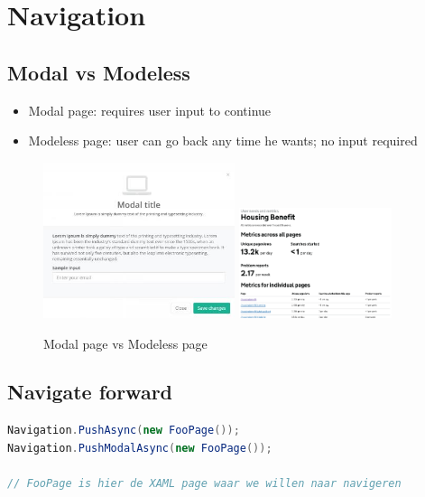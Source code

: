 \documentclass{article}
\begin{document}
\section{Navigation}

\subsection{Modal vs Modeless}

\begin{itemize}
    \item Modal page: requires user input to continue
    \item Modeless page: user can go back any time he wants; no input required
\end{itemize}

\begin{figure}[H]
    \centering
    \includegraphics[width=0.5\textwidth]{modal-page.png}
    \includegraphics[width=0.4\textwidth]{modeless-page.png}
    \caption{Modal page vs Modeless page}
\end{figure}

\subsection{Navigate forward}

\begin{lstlisting}[language=csharp]
Navigation.PushAsync(new FooPage());
Navigation.PushModalAsync(new FooPage());

// FooPage is hier de XAML page waar we willen naar navigeren
\end{lstlisting}
\end{document}
